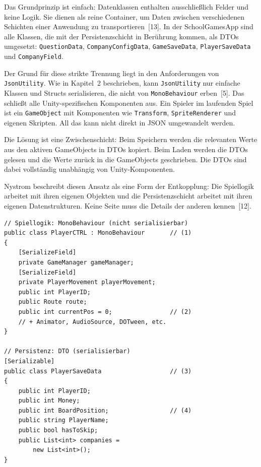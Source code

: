 \documentclass[12pt,a4paper]{article}
\begin{document}
Das Grundprinzip ist einfach: Datenklassen enthalten ausschließlich Felder und keine Logik. Sie dienen als reine Container, um Daten zwischen verschiedenen Schichten einer Anwendung zu transportieren~[13]. In der SchoolGamesApp sind alle Klassen, die mit der Persistenzschicht in Berührung kommen, als DTOs umgesetzt: \texttt{QuestionData}, \texttt{CompanyConfigData}, \texttt{GameSaveData}, \texttt{PlayerSaveData} und \texttt{CompanyField}.

Der Grund für diese strikte Trennung liegt in den Anforderungen von \texttt{JsonUtility}. Wie in Kapitel~2 beschrieben, kann \texttt{JsonUtility} nur einfache Klassen und Structs serialisieren, die nicht von \texttt{MonoBehaviour} erben~[5]. Das schließt alle Unity-spezifischen Komponenten aus. Ein Spieler im laufenden Spiel ist ein \texttt{GameObject} mit Komponenten wie \texttt{Transform}, \texttt{SpriteRenderer} und eigenen Skripten. All das kann nicht direkt in JSON umgewandelt werden.

Die Lösung ist eine Zwischenschicht: Beim Speichern werden die relevanten Werte aus den aktiven GameObjects in DTOs kopiert. Beim Laden werden die DTOs gelesen und die Werte zurück in die GameObjects geschrieben. Die DTOs sind dabei vollständig unabhängig von Unity-Komponenten.

Nystrom beschreibt diesen Ansatz als eine Form der Entkopplung: Die Spiellogik arbeitet mit ihren eigenen Objekten und die Persistenzschicht arbeitet mit ihren eigenen Datenstrukturen. Keine Seite muss die Details der anderen kennen~[12].

\begin{lstlisting}
// Spiellogik: MonoBehaviour (nicht serialisierbar)
public class PlayerCTRL : MonoBehaviour       // (1)
{
    [SerializeField]
    private GameManager gameManager;
    [SerializeField]
    private PlayerMovement playerMovement;
    public int PlayerID;
    public Route route;
    public int currentPos = 0;                // (2)
    // + Animator, AudioSource, DOTween, etc.
}

// Persistenz: DTO (serialisierbar)
[Serializable]
public class PlayerSaveData                   // (3)
{
    public int PlayerID;
    public int Money;
    public int BoardPosition;                 // (4)
    public string PlayerName;
    public bool hasToSkip;
    public List<int> companies =
        new List<int>();
}
\end{lstlisting}
\end{document}
